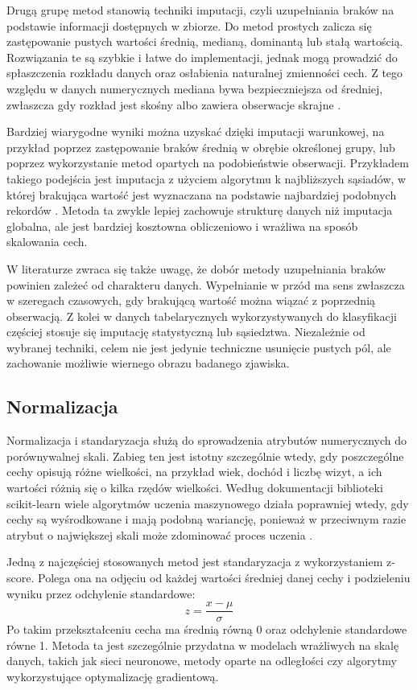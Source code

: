 {Drugą grupę metod stanowią techniki imputacji, czyli uzupełniania braków na podstawie informacji dostępnych w zbiorze. Do metod prostych zalicza się zastępowanie pustych wartości średnią, medianą, dominantą lub stałą wartością. Rozwiązania te są szybkie i łatwe do implementacji, jednak mogą prowadzić do spłaszczenia rozkładu danych oraz osłabienia naturalnej zmienności cech. Z tego względu w danych numerycznych mediana bywa bezpieczniejsza od średniej, zwłaszcza gdy rozkład jest skośny albo zawiera obserwacje skrajne \cite{Walker2021}.

Bardziej wiarygodne wyniki można uzyskać dzięki imputacji warunkowej, na przykład poprzez zastępowanie braków średnią w obrębie określonej grupy, lub poprzez wykorzystanie metod opartych na podobieństwie obserwacji. Przykładem takiego podejścia jest imputacja z użyciem algorytmu k najbliższych sąsiadów, w której brakująca wartość jest wyznaczana na podstawie najbardziej podobnych rekordów \cite{Walker2021,SklearnKNNImputer}. Metoda ta zwykle lepiej zachowuje strukturę danych niż imputacja globalna, ale jest bardziej kosztowna obliczeniowo i wrażliwa na sposób skalowania cech.

W literaturze zwraca się także uwagę, że dobór metody uzupełniania braków powinien zależeć od charakteru danych. Wypełnianie w przód ma sens zwłaszcza w szeregach czasowych, gdy brakującą wartość można wiązać z poprzednią obserwacją. Z kolei w danych tabelarycznych wykorzystywanych do klasyfikacji częściej stosuje się imputację statystyczną lub sąsiedztwa. Niezależnie od wybranej techniki, celem nie jest jedynie techniczne usunięcie pustych pól, ale zachowanie możliwie wiernego obrazu badanego zjawiska.

\subsection{Normalizacja}
Normalizacja i standaryzacja służą do sprowadzenia atrybutów numerycznych do porównywalnej skali. Zabieg ten jest istotny szczególnie wtedy, gdy poszczególne cechy opisują różne wielkości, na przykład wiek, dochód i liczbę wizyt, a ich wartości różnią się o kilka rzędów wielkości. Według dokumentacji biblioteki scikit-learn wiele algorytmów uczenia maszynowego działa poprawniej wtedy, gdy cechy są wyśrodkowane i mają podobną wariancję, ponieważ w przeciwnym razie atrybut o największej skali może zdominować proces uczenia \cite{SklearnPreprocessing,SklearnStandardScaler}.

Jedną z najczęściej stosowanych metod jest standaryzacja z wykorzystaniem z-score. Polega ona na odjęciu od każdej wartości średniej danej cechy i podzieleniu wyniku przez odchylenie standardowe:
\[
z = \frac{x - \mu}{\sigma}
\]
Po takim przekształceniu cecha ma średnią równą 0 oraz odchylenie standardowe równe 1. Metoda ta jest szczególnie przydatna w modelach wrażliwych na skalę danych, takich jak sieci neuronowe, metody oparte na odległości czy algorytmy wykorzystujące optymalizację gradientową.

}
